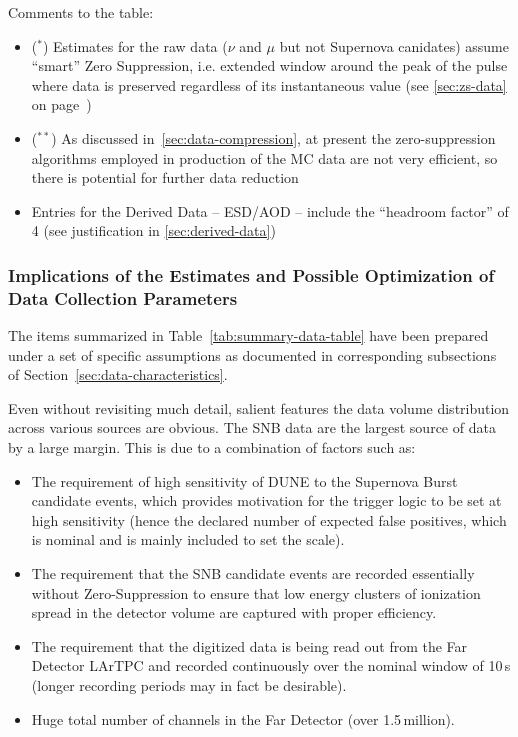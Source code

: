 Comments to the table:
\begin{itemize}
\item ($^*$) Estimates for the raw data ($\nu$ and $\mu$ but not Supernova canidates) assume ``smart'' Zero Suppression, i.e. extended
window around the peak of the pulse where data is preserved regardless of its instantaneous value (see \ref{sec:zs-data} on page~\pageref{sec:zs-data})

\item ($^{**}$) As discussed in~\ref{sec:data-compression}, at present the zero-suppression algorithms employed in production of the
MC data are not very efficient, so there is potential for further data reduction

\item Entries for the Derived Data -- ESD/AOD --  include the ``headroom factor'' of 4 (see justification in \ref{sec:derived-data})
\end{itemize}

\subsubsection{Implications of the Estimates and Possible Optimization of Data Collection Parameters}
The items summarized in Table~\ref{tab:summary-data-table} have been prepared under a set of specific
assumptions as documented in corresponding subsections of Section~\ref{sec:data-characteristics}.

Even without revisiting much detail, salient features the data volume distribution across various sources are
obvious. The SNB data are the largest source of data by a large margin. This is due to a combination of factors such as:
\begin{itemize}
\item The requirement of high sensitivity of DUNE to the Supernova Burst candidate events, which provides motivation
for the trigger logic to be set at high sensitivity (hence the declared number of expected false positives, which is nominal
and is mainly included to set the scale).

\item The requirement that the SNB candidate events are recorded essentially without Zero-Suppression to ensure that low energy
clusters of ionization spread in the detector volume are captured with proper efficiency.

\item The requirement that the digitized data is being read out from the Far Detector LArTPC and recorded continuously over
the nominal window of 10\,s (longer recording periods may in fact be desirable).

\item Huge total number of channels in the Far Detector (over 1.5\,million).

\end{itemize}

